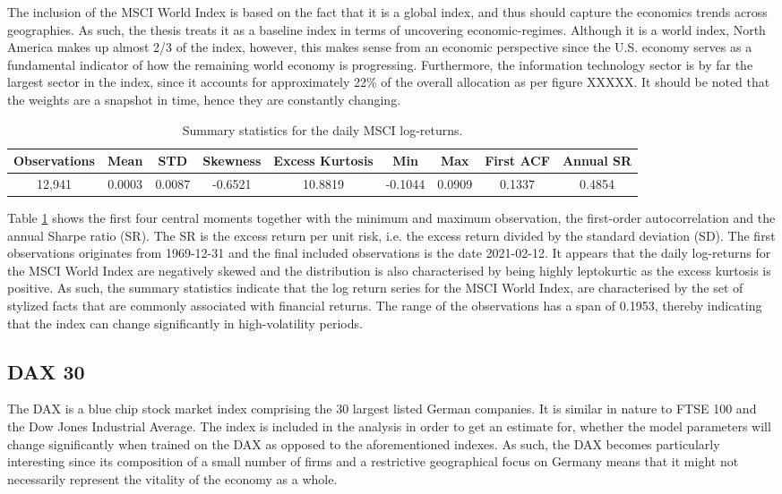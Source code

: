 
The inclusion of the MSCI World Index is based on the fact that it is a global index, and thus should capture the economics trends across geographies. As such, the thesis treats it as a baseline index in terms of uncovering economic-regimes. Although it is a world index, North America makes up almost 2/3 of the index, however, this makes sense from an economic perspective since the U.S. economy serves as a fundamental indicator of how the remaining world economy is progressing. Furthermore, the information technology sector is by far the largest sector in the index, since it accounts for approximately 22\% of the overall allocation as per figure XXXXX. It should be noted that the weights are a snapshot in time, hence they are constantly changing. 

\begin{table}[H]
\caption{Summary statistics for the daily MSCI log-returns.}
\centering
\begin{tabular}{c c c c c c c c c} 
\hline\hline
Observations & Mean & STD & Skewness & Excess Kurtosis & Min & Max & First ACF & Annual SR \\
\hline
12,941 & 0.0003 & 0.0087 & -0.6521 & 10.8819 & -0.1044 & 0.0909 & 0.1337 & 0.4854 \\
\hline
\end{tabular}
\label{tab:summary_stats_MSCI}
\end{table}

Table \ref{tab:summary_stats_MSCI} shows the first four central moments together with the minimum and maximum observation, the first-order autocorrelation and the annual Sharpe ratio (SR). The SR is the excess return per unit risk, i.e. the excess return divided by the standard deviation (SD). The first observations originates from 1969-12-31 and the final included observations is the date 2021-02-12. It appears that the daily log-returns for the MSCI World Index are negatively skewed and the distribution is also characterised by being highly leptokurtic as the excess kurtosis is positive. As such, the summary statistics indicate that the log return series for the MSCI World Index, are characterised by the set of stylized facts that are commonly associated with financial returns. The range of the observations has a span of 0.1953, thereby indicating that the index can change significantly in high-volatility periods.

\subsection{DAX 30}
\label{subsection: DAX 30}
The DAX is a blue chip stock market index comprising the 30 largest listed German companies. It is similar in nature to FTSE 100 and the Dow Jones Industrial Average. The index is included in the analysis in order to get an estimate for, whether the model parameters will change significantly when trained on the DAX as opposed to the aforementioned indexes. As such, the DAX becomes particularly interesting since its composition of a small number of firms and a restrictive geographical focus on Germany means that it might not necessarily represent the vitality of the economy as a whole. 

